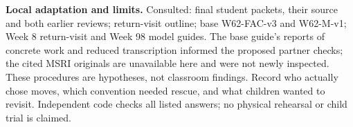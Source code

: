 \documentclass[10pt]{article}
\begin{document}
\textbf{Local adaptation and limits.} Consulted: final student packets, their source and both earlier reviews; return-visit outline; base W62-FAC-v3 and W62-M-v1; Week 8 return-visit and Week 98 model guides. The base guide's reports of concrete work and reduced transcription informed the proposed partner checks; the cited MSRI originals are unavailable here and were not newly inspected. These procedures are hypotheses, not classroom findings. Record who actually chose moves, which convention needed rescue, and what children wanted to revisit. Independent code checks all listed answers; no physical rehearsal or child trial is claimed.
\end{document}
